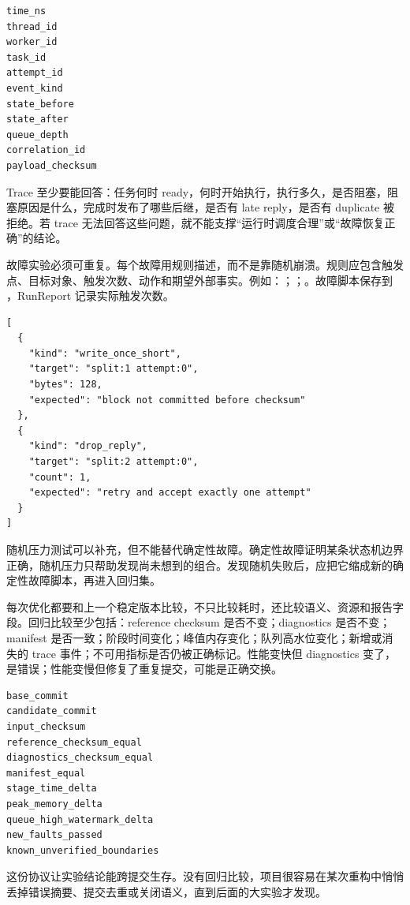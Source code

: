 \begin{lstlisting}[numbers=none,caption={trace.jsonl 事件字段}]
time_ns
thread_id
worker_id
task_id
attempt_id
event_kind
state_before
state_after
queue_depth
correlation_id
payload_checksum
\end{lstlisting}

Trace 至少要能回答：任务何时 ready，何时开始执行，执行多久，是否阻塞，阻塞原因是什么，完成时发布了哪些后继，是否有 late reply，是否有 duplicate 被拒绝。若 trace 无法回答这些问题，就不能支撑“运行时调度合理”或“故障恢复正确”的结论。

故障实验必须可重复。每个故障用规则描述，而不是靠随机崩溃。规则应包含触发点、目标对象、触发次数、动作和期望外部事实。例如：；；。故障脚本保存到 ，RunReport 记录实际触发次数。

\begin{lstlisting}[numbers=none,caption={faults.json 的示例}]
[
  {
    "kind": "write_once_short",
    "target": "split:1 attempt:0",
    "bytes": 128,
    "expected": "block not committed before checksum"
  },
  {
    "kind": "drop_reply",
    "target": "split:2 attempt:0",
    "count": 1,
    "expected": "retry and accept exactly one attempt"
  }
]
\end{lstlisting}

随机压力测试可以补充，但不能替代确定性故障。确定性故障证明某条状态机边界正确，随机压力只帮助发现尚未想到的组合。发现随机失败后，应把它缩成新的确定性故障脚本，再进入回归集。

每次优化都要和上一个稳定版本比较，不只比较耗时，还比较语义、资源和报告字段。回归比较至少包括：reference checksum 是否不变；diagnostics 是否不变；manifest 是否一致；阶段时间变化；峰值内存变化；队列高水位变化；新增或消失的 trace 事件；不可用指标是否仍被正确标记。性能变快但 diagnostics 变了，是错误；性能变慢但修复了重复提交，可能是正确交换。

\begin{lstlisting}[numbers=none,caption={regression summary 字段}]
base_commit
candidate_commit
input_checksum
reference_checksum_equal
diagnostics_checksum_equal
manifest_equal
stage_time_delta
peak_memory_delta
queue_high_watermark_delta
new_faults_passed
known_unverified_boundaries
\end{lstlisting}

这份协议让实验结论能跨提交生存。没有回归比较，项目很容易在某次重构中悄悄丢掉错误摘要、提交去重或关闭语义，直到后面的大实验才发现。

